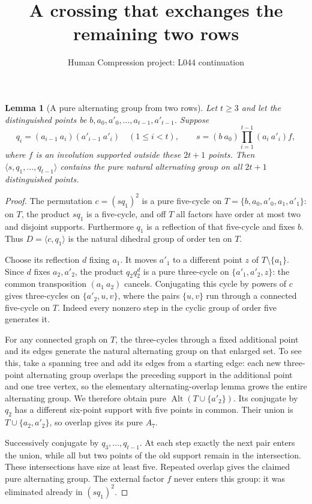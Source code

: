 \documentclass[11pt,a4paper]{article}
\title{A crossing that exchanges the remaining two rows}
\author{Human Compression project: L044 continuation}
\date{}
\newtheorem{lemma}{Lemma}
\newcommand{\gen}[1]{\langle#1\rangle}
\begin{document}
\maketitle
\begin{lemma}[A pure alternating group from two rows]\label{alternating}
Let $t\ge3$ and let the distinguished points be
$b,a_0,a'_0,\ldots,a_{t-1},a'_{t-1}$. Suppose
\[
 q_i=(a_{i-1}\ a_i)(a'_{i-1}\ a'_i)\quad(1\le i<t),
 \qquad
 s=(b\ a_0)\prod_{i=1}^{t-1}(a_i\ a'_i)f,
\]
where $f$ is an involution supported outside these $2t+1$ points.
Then $\gen{s,q_1,\ldots,q_{t-1}}$ contains the pure natural
alternating group on all $2t+1$ distinguished points.
\end{lemma}
\begin{proof}
The permutation $c=(sq_1)^2$ is a pure five-cycle on
$T=\{b,a_0,a'_0,a_1,a'_1\}$: on $T$, the product $sq_1$
is a five-cycle, and off $T$ all factors have order at most
two and disjoint supports. Furthermore $q_1$ is a reflection
of that five-cycle and fixes $b$. Thus $D=\gen{c,q_1}$
is the natural dihedral group of order ten on $T$.

Choose its reflection $d$ fixing $a_1$. It moves $a'_1$
to a different point $z$ of $T\setminus\{a_1\}$. Since $d$
fixes $a_2,a'_2$, the product $q_2q_2^d$ is a pure three-cycle
on $\{a'_1,a'_2,z\}$: the common transposition $(a_1\ a_2)$
cancels. Conjugating this cycle by powers of $c$ gives
three-cycles on $\{a'_2,u,v\}$, where the pairs $\{u,v\}$
run through a connected five-cycle on $T$. Indeed every nonzero
step in the cyclic group of order five generates it.

For any connected graph on $T$, the three-cycles through a
fixed additional point and its edges generate the natural
alternating group on that enlarged set. To see this, take a
spanning tree and add its edges from a starting edge: each new
three-point alternating group overlaps the preceding support
in the additional point and one tree vertex, so the elementary
alternating-overlap lemma grows the entire alternating group.
We therefore obtain pure $\operatorname{Alt}(T\cup\{a'_2\})$.
Its conjugate by $q_2$ has a different six-point support with
five points in common. Their union is $T\cup\{a_2,a'_2\}$,
so overlap gives its pure $A_7$.

Successively conjugate by $q_3,\ldots,q_{t-1}$. At each step
exactly the next pair enters the union, while all but two points
of the old support remain in the intersection. These intersections
have size at least five. Repeated overlap gives the claimed
pure alternating group. The external factor $f$ never enters
this group: it was eliminated already in $(sq_1)^2$.
\end{proof}
\end{document}
